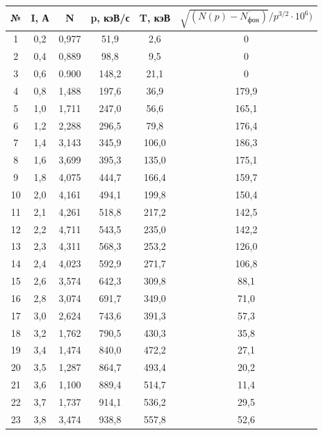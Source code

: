 \documentclass[a4paper, 12pt]{article}%
\begin{document}
\begin{enumerate}
		\begin{longtable}{|c|c|c|c|c|c|}
			\hline
			№   & I, А  & N      & p, кэВ/с  & T, кэВ  & $\sqrt{(N(p) - \overline{N_{\text{фон}}})}/p^{3/2} \cdot 10^6)$   \\ \hline
			1   & 0,2   & 0,977  & 51,9      & 2,6     & 0     \\ \hline
			2   & 0,4   & 0,889  & 98,8      & 9,5     & 0     \\ \hline
			3   & 0,6   & 0.900  & 148,2     & 21,1    & 0     \\ \hline
			4   & 0,8   & 1,488  & 197,6     & 36,9    & 179,9 \\ \hline
			5   & 1,0   & 1,711  & 247,0     & 56,6    & 165,1 \\ \hline
			6   & 1,2   & 2,288  & 296,5     & 79,8    & 176,4 \\ \hline
			7   & 1,4   & 3,143  & 345,9     & 106,0   & 186,3 \\ \hline
			8   & 1,6   & 3,699  & 395,3     & 135,0   & 175,1 \\ \hline
			9   & 1,8   & 4,075  & 444,7     & 166,4   & 159,7 \\ \hline
			10  & 2,0   & 4,161  & 494,1     & 199,8   & 150,4 \\ \hline
			11  & 2,1   & 4,261  & 518,8     & 217,2   & 142,5 \\ \hline
			12  & 2,2   & 4,711  & 543,5     & 235,0   & 142,2 \\ \hline
			13  & 2,3   & 4,311  & 568,3     & 253,2   & 126,0 \\ \hline
			14  & 2,4   & 4,023  & 592,9     & 271,7   & 106,8 \\ \hline
			15  & 2,6   & 3,574  & 642,3     & 309,8   & 88,1  \\ \hline
			16  & 2,8   & 3,074  & 691,7     & 349,0   & 71,0  \\ \hline
			17  & 3,0   & 2,624  & 743,6     & 391,3   & 57,3  \\ \hline
			18  & 3,2   & 1,762  & 790,5     & 430,3   & 35,8  \\ \hline
			19  & 3,4   & 1,474  & 840,0     & 472,2   & 27,1  \\ \hline
			20  & 3,5   & 1,287  & 864,7     & 493,4   & 20,2  \\ \hline
			21  & 3,6   & 1,100  & 889,4     & 514,7   & 11,4  \\ \hline
			22  & 3,7   & 1,737  & 914,1     & 536,2   & 29,5  \\ \hline
			23  & 3,8   & 3,474  & 938,8     & 557,8   & 52,6  \\ \hline

\end{longtable}
\end{enumerate}
\end{document}
